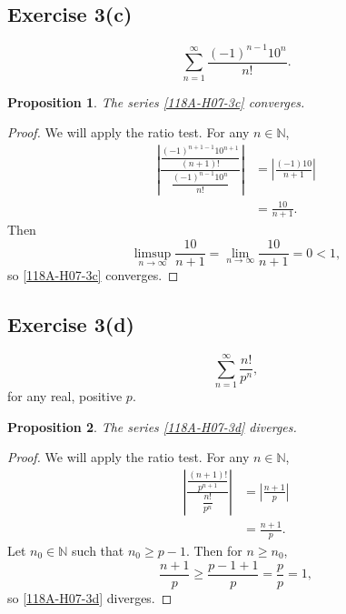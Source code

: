 \documentclass[12pt]{article}
\newtheorem{proposition}{Proposition}
\newenvironment{problem}
    {\begin{lrbox}{\mybox}\begin{minipage}{0.98\textwidth}}
    {\end{minipage}\end{lrbox}\framebox[\textwidth]{\usebox{\mybox}}}
\newcommand{\N}{\mathbb{N}} %
\newcommand{\<}{\left\langle} %
\renewcommand{\>}{\right\rangle} %
\begin{document}
\newpage
\subsection*{Exercise 3(c)}
\begin{problem}
    \begin{equation}\label{118A-H07-3c}
        \sum_{n=1}^\infty \frac{(-1)^{n-1} 10^n}{n!}.
    \end{equation}
\end{problem}

\begin{proposition}
    The series \eqref{118A-H07-3c} converges.
\end{proposition}

\begin{proof}
    We will apply the ratio test. For any $n\in\N$,
    \begin{align*}
        \left|\frac{\dfrac{(-1)^{n+1-1} 10^{n+1}}{(n+1)!}}{\dfrac{(-1)^{n-1} 10^n}{n!}}\right|
            &= \left|\frac{(-1)10}{n+1}\right| \\
            &= \frac{10}{n+1}. 
    \end{align*}
    Then
    \[\limsup_{n\to\infty} \frac{10}{n+1} = \lim_{n\to\infty} \frac{10}{n+1} = 0 < 1,\]
    so \eqref{118A-H07-3c} converges.
    
\end{proof}

\subsection*{Exercise 3(d)}
\begin{problem}
    \begin{equation}\label{118A-H07-3d}
        \sum_{n=1}^\infty \frac{n!}{p^n},
    \end{equation}
    for any real, positive $p$.
\end{problem}

\begin{proposition}
    The series \eqref{118A-H07-3d} diverges.
\end{proposition}

\begin{proof}
    We will apply the ratio test. For any $n\in\N$,
    \begin{align*}
        \left|\frac{\dfrac{(n+1)!}{p^{n+1}}}{\dfrac{n!}{p^n}}\right|
            &= \left|\frac{n+1}{p}\right| \\
            &= \frac{n+1}{p}. 
    \end{align*}
    Let $n_0\in\N$ such that $n_0\geq p - 1$. Then for $n\geq n_0$,
    \[\frac{n+1}{p} \geq \frac{p-1+1}{p} = \frac{p}{p} = 1,\]
    so \eqref{118A-H07-3d} diverges.
    
\end{proof}
\end{document}
